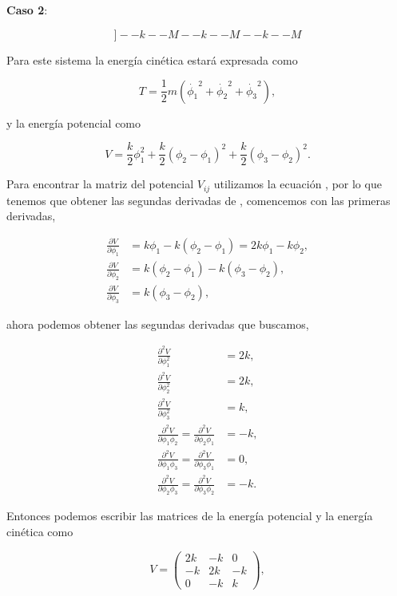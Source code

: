 \documentclass[a4paper,10pt]{article}
\numberwithin{equation}{section}
\begin{document}
\textbf{Caso 2}:

$$
] - - k - - M - - k - - M - - k - - M
$$

Para este sistema la energía cinética estará expresada como

\begin{equation}
 T = \frac{1}{2}m(\dot{\phi_1}^2 + \dot{\phi_2}^2 + \dot{\phi_3}^2),
\end{equation}

y la energía potencial como

\begin{equation}
 V = \frac{k}{2}\phi_1^2 + \frac{k}{2}(\phi_2 - \phi_1)^2 + \frac{k}{2}(\phi_3 - \phi_2)^2.
 \label{eq:energpoten3}
\end{equation}

Para encontrar la matriz del potencial $V_{ij}$ utilizamos la ecuación ,
por lo que tenemos que obtener las segundas derivadas de , comencemos 
con las primeras derivadas,

\begin{align*}
 \frac{\partial V}{\partial \phi_1} &= k\phi_1 - k (\phi_2 - \phi_1) = 2k\phi_1 - k\phi_2, \\
 \frac{\partial V}{\partial \phi_2} &= k (\phi_2 - \phi_1) - k (\phi_3 - \phi_2), \\
 \frac{\partial V}{\partial \phi_3} &= k (\phi_3 - \phi_2),
\end{align*}

ahora podemos obtener las segundas derivadas que buscamos,

\begin{align*}
 \frac{\partial^2 V}{\partial \phi_1^2} &= 2k, \\
 \frac{\partial^2 V}{\partial \phi_2^2} &= 2k, \\
 \frac{\partial^2 V}{\partial \phi_3^2} &= k, \\
 \frac{\partial^2 V}{\partial \phi_1\phi_2} = \frac{\partial^2 V}{\partial \phi_2\phi_1}&= -k, \\
 \frac{\partial^2 V}{\partial \phi_1\phi_3} = \frac{\partial^2 V}{\partial \phi_3\phi_1}  &= 0, \\
 \frac{\partial^2 V}{\partial \phi_2\phi_3} =  \frac{\partial^2 V}{\partial \phi_3\phi_2} &= -k.
\end{align*}

Entonces podemos escribir las matrices de la energía potencial y la energía 
cinética como

\begin{equation}
 V = \begin{pmatrix}
      2k & -k & 0 \\
      -k & 2k & -k \\
      0 & -k & k
     \end{pmatrix},
\end{equation}
\end{document}
